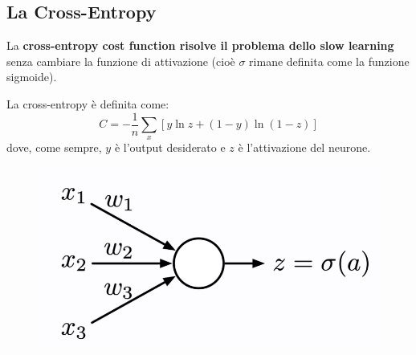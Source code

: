 \subsection{La Cross-Entropy} La \textbf{cross-entropy cost function risolve il problema dello slow learning} senza cambiare la funzione di attivazione (cioè $\sigma$ rimane definita come la funzione sigmoide). 


La cross-entropy è definita come:
\begin{equation}
    C=-\frac{1}{n}\sum_x[y\ln{z}+(1-y)\ln{(1-z)}]
\end{equation}
dove, come sempre, $y$ è l'output desiderato e $z$ è l'attivazione del neurone.
\begin{figure}[h]
    \includegraphics[scale=.5]{images/best_practices/cross_entropy.png}
    \centering
\end{figure}




